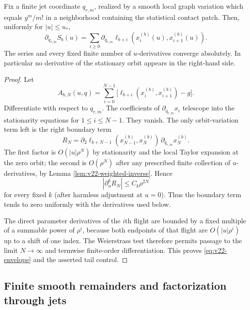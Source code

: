 \begin{lemma}
\label{lem:v22-envelope}
Fix a finite jet coordinate $q_{r,m}$, realized by a smooth local graph
variation which equals $y^m/m!$ in a neighborhood containing the statistical
contact patch.  Then, uniformly for $|u|\le u_*$,
\begin{equation}\label{eq:v22-envelope}
 \partial_{q_{r,m}}S_b(u)
 =\sum_{i\ge0}\partial_{q_{r,m}}\ell_{b+i}
       (x_i^{(b)}(u),x_{i+1}^{(b)}(u)).
\end{equation}
The series and every fixed finite number of $u$-derivatives converge
absolutely.  In particular no derivative of the stationary orbit appears in
the right-hand side.
\end{lemma}

\begin{proof}
Let
\[
 A_{b,N}(u,q)=\sum_{i=0}^{N-1}
 \bigl[\ell_{b+i}(x_i^{(b)},x_{i+1}^{(b)})-g\bigr].
\]
Differentiate with respect to $q_{r,m}$.  The coefficients of
$\partial_{q_{r,m}}x_i$ telescope into the stationarity equations for
$1\le i\le N-1$.  They vanish.  The only orbit-variation term left is the
right boundary term
\[
 R_N=\partial_2\ell_{b+N-1}(x_{N-1}^{(b)},x_N^{(b)})
             \,\partial_{q_{r,m}}x_N^{(b)}.
\]
The first factor is $O(|u|\rho^N)$ by stationarity and the local Taylor
expansion at the zero orbit; the second is $O(\rho^N)$ after any prescribed
finite collection of $u$-derivatives, by Lemma
\ref{lem:v22-weighted-inverse}.  Hence
\begin{equation}\label{eq:v22-tail-bound}
                |\partial_u^kR_N|\le C_k\rho^{2N}
\end{equation}
for every fixed $k$ (after harmless adjustment at $u=0$).  Thus the boundary
term tends to zero uniformly with the derivatives used below.

The direct parameter derivatives of the $i$th flight are bounded by a fixed
multiple of a summable power of $\rho^i$, because both endpoints of that
flight are $O(|u|\rho^i)$ up to a shift of one index.  The Weierstrass test
therefore permits passage to the limit $N\to\infty$ and termwise finite-order
differentiation.  This proves \eqref{eq:v22-envelope} and the asserted tail
control.
\end{proof}


\subsection{Finite smooth remainders and factorization through jets}


